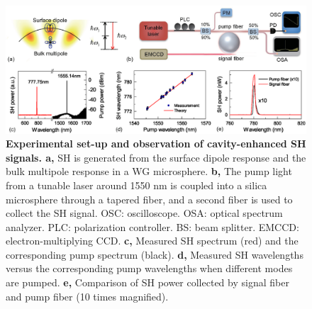 \documentclass[a4paper,8pt,hyperref, twocolumn]{article}
\begin{document}


\begin{figure}[!ht]
\centering
\includegraphics[width=18cm]{Fig1.eps}
\caption{\textbf{Experimental set-up and observation of cavity-enhanced SH signals. a, }SH is generated from the surface dipole response and the bulk multipole response in a WG microsphere. \textbf{b, }The pump light from a tunable laser around 1550 nm is coupled into a silica microsphere through a tapered fiber, and a second fiber is used to collect the SH signal. OSC: oscilloscope. OSA: optical spectrum analyzer. PLC: polarization controller. BS: beam splitter. EMCCD: electron-multiplying CCD. \textbf{c, }Measured SH spectrum (red) and the corresponding pump spectrum (black). \textbf{d, }Measured SH wavelengths versus the corresponding pump wavelengths when different modes are pumped. \textbf{e, }Comparison of SH power collected by signal fiber and pump fiber (10 times magnified).}
\label{pic:Fig1}
\end{figure}
\end{document}
